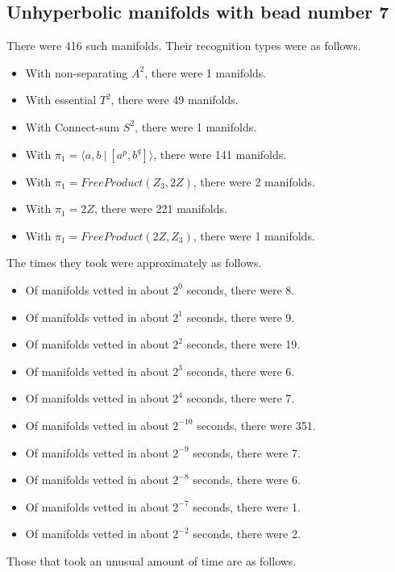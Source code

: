 \documentclass{article}
\begin{document}
\subsection{Unhyperbolic manifolds with bead number 7}
There were 416 such manifolds.
Their recognition types were as follows.
\begin{itemize}
\item With non-separating $A^2$, there were 1 manifolds.
\item With essential $T^2$, there were 49 manifolds.
\item With Connect-sum $S^2$, there were 1 manifolds.
\item With $\pi_1 = \langle a,b\ |\ [a^p,b^q]\rangle$, there were 141 manifolds.
\item With $\pi_1 =FreeProduct( Z_3, 2 Z )$, there were 2 manifolds.
\item With $\pi_1 =2 Z$, there were 221 manifolds.
\item With $\pi_1 =FreeProduct( 2 Z, Z_3 )$, there were 1 manifolds.
\end{itemize}
The times they took were approximately as follows.
\begin{itemize}
\item Of manifolds vetted in about $2^{0}$ seconds, there were 8.
\item Of manifolds vetted in about $2^{1}$ seconds, there were 9.
\item Of manifolds vetted in about $2^{2}$ seconds, there were 19.
\item Of manifolds vetted in about $2^{3}$ seconds, there were 6.
\item Of manifolds vetted in about $2^{4}$ seconds, there were 7.
\item Of manifolds vetted in about $2^{-10}$ seconds, there were 351.
\item Of manifolds vetted in about $2^{-9}$ seconds, there were 7.
\item Of manifolds vetted in about $2^{-8}$ seconds, there were 6.
\item Of manifolds vetted in about $2^{-7}$ seconds, there were 1.
\item Of manifolds vetted in about $2^{-2}$ seconds, there were 2.
\end{itemize}
Those that took an unusual amount of time are as follows.
\end{document}
